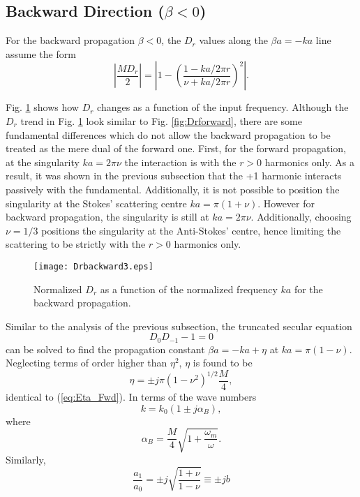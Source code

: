 \documentclass[journal]{IEEEtran}
\begin{document}
\subsection{Backward Direction ($\beta<0$)}
For the backward propagation $\beta<0$, the $D_r$ values along the $\beta a=-ka$ line assume the form
\begin{equation}
\label{eq:normalizedDr_BWD}
\left| \frac{MD_r}{2}\right|=\left|1-\left(\frac{1-ka/2\pi r}{\nu+ka/2\pi r}\right)^2\right|.
\end{equation}

Fig. \ref{fig:Drbackward} shows how $D_r$ changes as a function of the input frequency.  Although the $D_r$ trend in Fig. \ref{fig:Drbackward} look similar to Fig. \ref{fig:Drforward}, there are some fundamental differences which do not allow the backward propagation to be treated as the mere dual of the forward one. First, for the forward propagation, at the singularity $ka=2\pi\nu$ the interaction is with the  $r>0$ harmonics only. As a result, it was shown in the previous subsection that the +1 harmonic interacts passively with the fundamental. Additionally, it is not possible to position the singularity at the Stokes' scattering centre $ka=\pi(1+\nu)$. However for backward propagation, the singularity is still at $ka=2\pi\nu$. Additionally, choosing $\nu=1/3$ positions the singularity at the Anti-Stokes' centre, hence limiting the scattering to be strictly with the $r>0$ harmonics only. 
\begin{figure}
\centering
\texttt{[image: Drbackward3.eps]}
\caption{Normalized $D_r$ as a function of the normalized frequency $ka$ for the backward propagation.}
\label{fig:Drbackward}
\end{figure}
Similar to the analysis of the previous subsection, the truncated secular equation
\begin{equation}
\label{eq:SecularBackwardSimplified}
D_0D_{-1}-1=0
\end{equation}
can be solved to find the propagation constant $\beta a=-ka+\eta$ at $ka=\pi(1-\nu)$. Neglecting terms of order higher than $\eta^2$, $\eta$ is found to be
\begin{equation}
\eta=\pm j\pi\left(1-\nu^2\right)^{1/2}\frac{M}{4},
\end{equation}
identical to (\ref{eq:Eta_Fwd}). In terms of the wave numbers
\begin{equation}
\label{eq:k_Bwd}
k=k_0\left(1\pm j\alpha_B\right),
\end{equation}
where 
\begin{equation}
\label{eq:alphaB}
\alpha_B=\frac{M}{4}\sqrt{1+\frac{\omega_m}{\omega}}.
\end{equation}
Similarly,
\begin{equation}
\label{eq:a1_a0_Bwd}
\frac{a_{1}}{a_0}=\pm j\sqrt{\frac{1+\nu}{1-\nu}}\equiv \pm jb
\end{equation}
\end{document}
